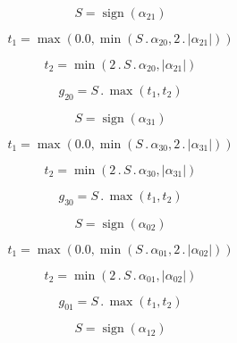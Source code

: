 \documentclass{article}
\begin{document}
\begin{dmath}S = \operatorname{sign}{\left (\alpha_{21} \right )}\end{dmath}

\begin{dmath}t_{1} = \max\left(0.0, \min\left(S \,.\, \alpha_{20}, 2 \,.\, \left|{\alpha_{21}}\right|\right)\right)\end{dmath}

\begin{dmath}t_{2} = \min\left(2 \,.\, S \,.\, \alpha_{20}, \left|{\alpha_{21}}\right|\right)\end{dmath}

\begin{dmath}g_{20} = S \,.\, \max\left(t_{1}, t_{2}\right)\end{dmath}

\begin{dmath}S = \operatorname{sign}{\left (\alpha_{31} \right )}\end{dmath}

\begin{dmath}t_{1} = \max\left(0.0, \min\left(S \,.\, \alpha_{30}, 2 \,.\, \left|{\alpha_{31}}\right|\right)\right)\end{dmath}

\begin{dmath}t_{2} = \min\left(2 \,.\, S \,.\, \alpha_{30}, \left|{\alpha_{31}}\right|\right)\end{dmath}

\begin{dmath}g_{30} = S \,.\, \max\left(t_{1}, t_{2}\right)\end{dmath}

\begin{dmath}S = \operatorname{sign}{\left (\alpha_{02} \right )}\end{dmath}

\begin{dmath}t_{1} = \max\left(0.0, \min\left(S \,.\, \alpha_{01}, 2 \,.\, \left|{\alpha_{02}}\right|\right)\right)\end{dmath}

\begin{dmath}t_{2} = \min\left(2 \,.\, S \,.\, \alpha_{01}, \left|{\alpha_{02}}\right|\right)\end{dmath}

\begin{dmath}g_{01} = S \,.\, \max\left(t_{1}, t_{2}\right)\end{dmath}

\begin{dmath}S = \operatorname{sign}{\left (\alpha_{12} \right )}\end{dmath}
\end{document}

